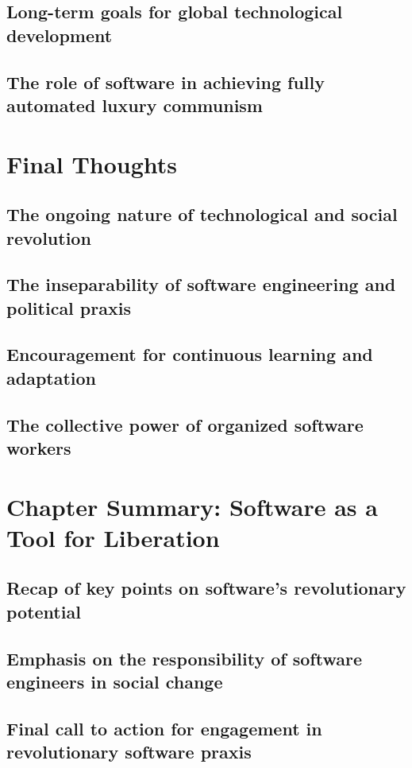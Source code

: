 \subsection{Long-term goals for global technological development}
\subsection{The role of software in achieving fully automated luxury communism}

\newpage

\section{Final Thoughts}
\subsection{The ongoing nature of technological and social revolution}
\subsection{The inseparability of software engineering and political praxis}
\subsection{Encouragement for continuous learning and adaptation}
\subsection{The collective power of organized software workers}

\newpage

\section{Chapter Summary: Software as a Tool for Liberation}
\subsection{Recap of key points on software's revolutionary potential}
\subsection{Emphasis on the responsibility of software engineers in social change}
\subsection{Final call to action for engagement in revolutionary software praxis}